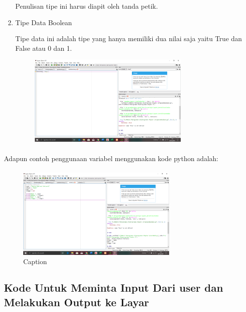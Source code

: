 \documentclass{article}
\begin{document}
\begin{enumerate}
            \par Penulisan tipe ini harus diapit oleh tanda petik.
            \item Tipe Data Boolean
            \par Tipe data ini adalah tipe yang hanya memiliki dua nilai saja yaitu True dan False atau 0 dan 1.
            \begin{figure}[h]
                    \centerline{\includegraphics[width=8cm]{figures/tipedataboolean.png}}
            \end{figure}
    \end{enumerate}
\paragraph{} Adapun contoh penggunaan variabel menggunakan kode python adalah:
\paragraph{}
            \begin{figure}[H]
                \centering
                \includegraphics[width=8cm]{figures/variabel.png}
                \caption{Caption}
                \label{fig:my_label}
            \end{figure}


\subsection{Kode Untuk Meminta Input Dari user dan Melakukan Output ke Layar}
\end{document}

